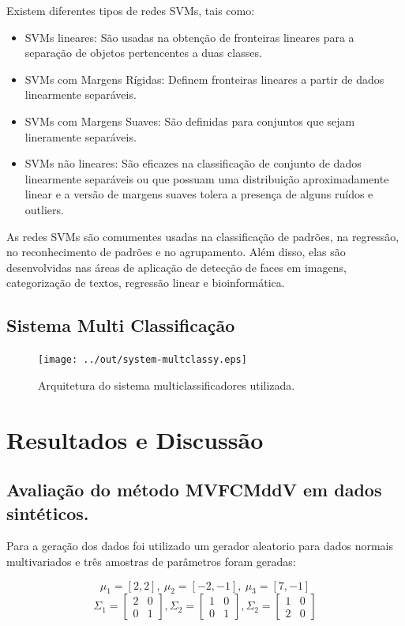 \documentclass[12pt]{article}
\begin{document}
Existem diferentes tipos de redes SVMs, tais como:
\begin{itemize}
    \item SVMs lineares: São usadas na obtenção de fronteiras lineares para a separação de objetos pertencentes a duas classes.
    \item SVMs com Margens Rígidas: Definem fronteiras lineares a partir de dados linearmente separáveis.
    \item  SVMs com Margens Suaves: São definidas para conjuntos que sejam lineramente separáveis.
    \item SVMs não lineares: São eficazes na classificação de conjunto de dados linearmente separáveis ou que possuam uma distribuição aproximadamente linear e a versão de margens suaves tolera a presença de alguns ruídos e outliers.
\end{itemize}

As redes SVMs são comumentes usadas na classificação de padrões, na regressão, no reconhecimento de padrões e no agrupamento. Além disso, elas são desenvolvidas nas áreas de aplicação de detecção de faces em imagens, categorização de textos, regressão linear e bioinformática.



\subsection{Sistema Multi Classificação}

\begin{figure}[h]
\centering
\texttt{[image: ../out/system-multclassy.eps]}
\caption{Arquitetura do sistema multiclassificadores utilizada.}
\label{fig:mult_system_classy}
\end{figure}  

\section{Resultados e Discussão}\label{RD}

\subsection{Avaliação do método MVFCMddV em dados sintéticos.}
Para a geração dos dados foi utilizado um gerador aleatorio para dados normais multivariados e três amostras de parâmetros  foram geradas:

$$\mu_1 = [2, 2], \ \mu_2 = [-2, -1], \ \mu_3 = [7, -1] $$
$$\Sigma_1 = \left[ \begin{matrix}
2 & 0 \\ 
0 & 1
\end{matrix} \right], 
\Sigma_2 = \left[ \begin{matrix}
1 & 0 \\ 
0 & 1
\end{matrix} \right], 
\Sigma_2 = \left[ \begin{matrix}
1 & 0 \\ 
2 & 0
\end{matrix} \right] $$
\end{document}
